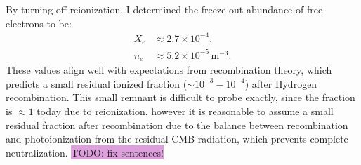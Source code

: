 \documentclass{aa}
\numberwithin{equation}{section}
\numberwithin{table}{section}
\numberwithin{figure}{section}
\begin{document}
By turning off reionization, I determined the freeze-out abundance of free electrons to be:
\begin{align*}
  X_e &\approx 2.7 \times10^{-4},
  \\
  n_e &\approx 5.2 \times10^{-5}\,\text{m}^{-3}.
\end{align*}
These values align well with expectations from recombination theory, which predicts a small residual ionized fraction ($\sim10^{-3}-10^{-4}$) after Hydrogen recombination. This small remnant is difficult to probe exactly, since the fraction is $\approx1$ today due to reionization, however it is reasonable to assume a small residual fraction after recombination due to the balance between recombination and photoionization from the residual CMB radiation, which prevents complete neutralization. \colorbox{Plum}{TODO: fix sentences!}



\end{document}
